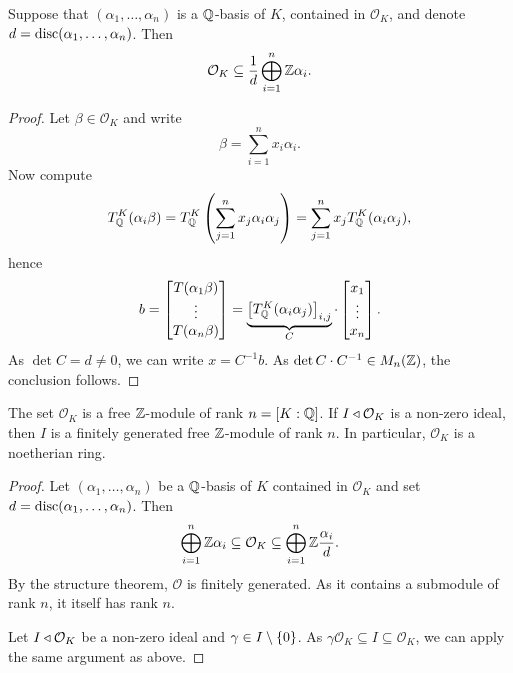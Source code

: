 \begin{lema}
\label{alg_int:lm:disc_base}
Suppose that $(\alpha_1, \dots, \alpha_n)$ is a $\mathbb{Q}$-basis of $K$,
contained in $\mathcal{O}_K$, and denote
$d = \operatorname{disc}(\alpha_1, \dots, \alpha_n)$. Then
\[
\mathcal{O}_K \subseteq
\frac{1}{d} \bigoplus_{i=1}^n \mathbb{Z} \alpha_i.
\]
\end{lema}

\begin{proof}
Let $\beta \in \mathcal{O}_K$ and write
\[
\beta = \sum_{i=1}^n x_i \alpha_i.
\]
Now compute
\[
T_{\mathbb{Q}}^K(\alpha_i \beta) =
T_{\mathbb{Q}}^K \left(\sum_{j=1}^n x_j \alpha_i \alpha_j\right) =
\sum_{j=1}^n x_j T_{\mathbb{Q}}^K(\alpha_i \alpha_j),
\]
hence
\[
b =
\begin{bmatrix}
T(\alpha_1 \beta) \\
\vdots \\
T(\alpha_n \beta)
\end{bmatrix}
=
\underbrace{
\begin{bmatrix}
T_{\mathbb{Q}}^K(\alpha_i \alpha_j)
\end{bmatrix}_{i,j}}_C
\cdot
\begin{bmatrix}
x_1 \\
\vdots \\
x_n
\end{bmatrix}.
\]
As $\det C = d \ne 0$, we can write $x = C^{-1} b$. As
$\det C \cdot C^{-1} \in M_n(\mathbb{Z})$, the conclusion follows.
\end{proof}

\begin{izrek}
The set $\mathcal{O}_K$ is a free $\mathbb{Z}$-module of rank
$n = [K : \mathbb{Q}]$. If $I \triangleleft \mathcal{O}_K$ is a non-zero ideal, then
$I$ is a finitely generated free $\mathbb{Z}$-module of rank $n$. In
particular, $\mathcal{O}_K$ is a noetherian ring.
\end{izrek}

\begin{proof}
Let $(\alpha_1, \dots, \alpha_n)$ be a $\mathbb{Q}$-basis of $K$ contained
in $\mathcal{O}_K$ and set $d = \operatorname{disc}(\alpha_1, \dots, \alpha_n)$.
Then
\[
\bigoplus_{i=1}^n \mathbb{Z} \alpha_i \subseteq
\mathcal{O}_K \subseteq
\bigoplus_{i=1}^n \mathbb{Z} \frac{\alpha_i}{d}.
\]
By the structure theorem, $\mathcal{O}$ is finitely generated.
As it contains a submodule of rank $n$, it itself has rank $n$.

Let $I \triangleleft \mathcal{O}_K$ be a non-zero ideal and
$\gamma \in I \setminus \left\{0\right\}$. As
$\gamma \mathcal{O}_K \subseteq I \subseteq \mathcal{O}_K$, we can
apply the same argument as above.
\end{proof}

